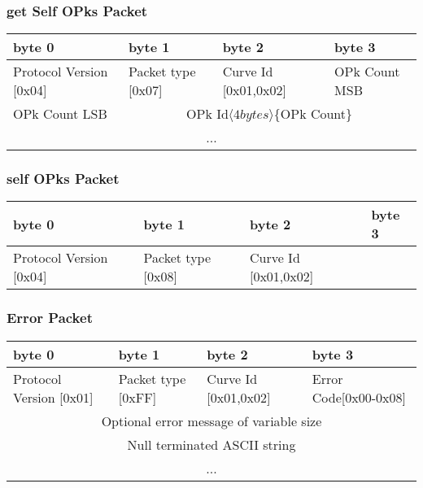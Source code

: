 \documentclass[a4paper,11pt]{article}
\begin{document}
    \subsubsection{get Self OPks Packet}
      \begin{center}
      \begin{tabular}{ | p{1.4in} | p{1.4in} | p{1.4in} | p{1.4in} |}
        \hline
        \cellcolor[gray]{0.85} byte 0 & \cellcolor[gray]{0.85} byte 1 & \cellcolor[gray]{0.85} byte 2 & \cellcolor[gray]{0.85}byte 3\\
        \hline
        Protocol Version [0x04] & Packet type [0x07] & Curve Id [0x01,0x02] & OPk Count MSB\\
        \hline
        OPk Count LSB & \multicolumn{3}{|c|}{OPk Id$\langle 4bytes\rangle $\{OPk Count\}}\\
        \cline{1-1}
        \multicolumn{4}{|c|}{...}\\
        \hline
      \end{tabular}
      \end{center}

    \subsubsection{self OPks Packet}
      \begin{center}
      \begin{tabular}{ | p{1.4in} | p{1.4in} | p{1.4in} | p{1.4in} |}
        \hline
        \cellcolor[gray]{0.85} byte 0 & \cellcolor[gray]{0.85} byte 1 & \cellcolor[gray]{0.85} byte 2 & \cellcolor[gray]{0.85}byte 3\\
        \hline
        Protocol Version [0x04] & Packet type [0x08] & Curve Id [0x01,0x02] & \\
        \hline
      \end{tabular}
      \end{center}
      
    \subsubsection{Error Packet}
      \begin{center}
      \begin{tabular}{ | p{1.4in} | p{1.4in} | p{1.4in} | p{1.4in} |}
        \hline
        \cellcolor[gray]{0.85} byte 0 & \cellcolor[gray]{0.85} byte 1 & \cellcolor[gray]{0.85} byte 2 & \cellcolor[gray]{0.85}byte 3\\
        \hline
        Protocol Version [0x01] & Packet type [0xFF] & Curve Id [0x01,0x02] & Error Code[0x00-0x08]\\
        \hline
        \multicolumn{4}{|c|}{Optional error message of variable size}\\
        \multicolumn{4}{|c|}{Null terminated ASCII string}\\
        \multicolumn{4}{|c|}{...}\\
        \hline        
      \end{tabular}
      \end{center}
\end{document}
